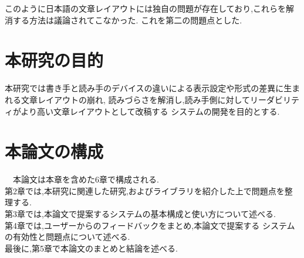 このように日本語の文章レイアウトには独自の問題が存在しており,これらを解消する方法は議論されてこなかった.
これを第二の問題点とした.

\section{本研究の目的}
本研究では書き手と読み手のデバイスの違いによる表示設定や形式の差異に生まれる文章レイアウトの崩れ,
読みづらさを解消し,読み手側に対してリーダビリティがより高い文章レイアウトとして改稿する
システムの開発を目的とする.

\section{本論文の構成}
 本論⽂は本章を含めた6章で構成される.
 \\第2章では,本研究に関連した研究,およびライブラリを紹介した上で問題点を整理する.
 \\第3章では,本論⽂で提案するシステムの基本構成と使い⽅について述べる.
 \\第4章では,ユーザーからのフィードバックをまとめ,本論⽂で提案する
システムの有効性と問題点について述べる.
 \\最後に,第5章で本論⽂のまとめと結論を述べる.

